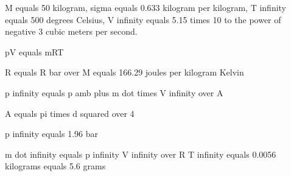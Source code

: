 M equals 50 kilogram, sigma equals 0.633 kilogram per kilogram, T infinity equals 500 degrees Celsius, V infinity equals 5.15 times 10 to the power of negative 3 cubic meters per second.

pV equals mRT

R equals R bar over M equals 166.29 joules per kilogram Kelvin

p infinity equals p amb plus m dot times V infinity over A

A equals pi times d squared over 4

p infinity equals 1.96 bar

m dot infinity equals p infinity V infinity over R T infinity equals 0.0056 kilograms equals 5.6 grams